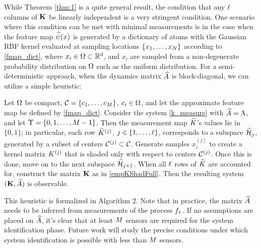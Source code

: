 While Theorem \ref{thm:1} is a quite general result, the condition that any $\ell$ columns of $\mathbf{K}$ be linearly independent is a very stringent condition. One scenario where this condition can be met with minimal measurements is in the case when the feature map $\widehat{\psi}(x)$ is generated by a dictionary of atoms with the Gaussian RBF kernel evaluated at sampling locations $\{x_1, \dots, x_{N}\}$ according to \eqref{fmap_dict}, where $x_i\in\Omega\subset\mathbb{R}^d$, and $x_i$ are sampled from a non-degenerate probability distribution on $\Omega$ such as the uniform distribution. For a semi-deterministic approach, when the dynamics matrix $\widehat{A}$ is block-diagonal, we can utilize a simple heuristic:

\begin{remark}\label{rem:1}
 Let $\Omega$ be compact, $\mathcal{C} = \{c_1,\dots,c_{M}\}$, $c_i\in\Omega$, and let the approximate feature map be defined by \eqref{fmap_dict}. Consider the system \eqref{k_measure} with $\widehat{A}=\Lambda$, and let $\Upsilon = \{0,1,\dots,M-1\}$. Then the measurement map $\widetilde{K}$'s values lie in $\{0, 1\}$; in particular, each row $\widetilde{K}^{(j)}$, $j\in\{1,\dots,\ell\}$, corresponds to a subspace $\widehat{\mathcal{H}}_{j}$, generated by a subset of centers $\mathcal{C}^{(j)}\subset\mathcal{C}$. Generate samples $x_i^{(j)}$ to create a kernel matrix $K^{(j)}$ that is shaded only with respect to centers $\mathcal{C}^{(j)}$. Once this is done, move on to the next subspace $\widehat{\mathcal{H}}_{j+1}$. When all $\ell$ rows of $\widetilde{K}$ are accounted for, construct the matrix $\mathbf{K}$ as in \eqref{empKShadFull}. Then the resulting system $(\mathbf{K}, \widehat{A})$ is observable. 
\end{remark}


This heuristic is formalized in Algorithm 2. Note that in practice, the matrix $\widehat{A}$ needs to be inferred from measurements of the process $f_{\tau}$. If no assumptions are placed on $\widehat{A}$, it's clear that at least $M$ sensors are required for the system identification phase. Future work will study the precise conditions under which system identification is possible with less than $M$ sensors.

